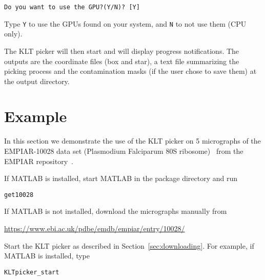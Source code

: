 \documentclass[12pt,a4paper]{article}
\begin{document}
\begin{flushleft}
	\texttt{Do you want to use the GPU?(Y/N)? [Y] }
\end{flushleft}
 Type \texttt{Y} to use the GPUs found on your system, and \texttt{N} to not use them (CPU only).

 \bigskip

 The KLT picker will then start and will display progress notifications.
 The outputs are the coordinate files (box and star), a text file summarizing the picking process  and the contamination masks (if the user chose to save them) at the output directory.

 \section{Example}\label{sec:example}
In this section we demonstrate the use of the KLT picker on 5 micrographs of the EMPIAR-10028 data set (Plasmodium Falciparum 80S ribosome)~\cite{10028} from the EMPIAR repository~\cite{EMPIAR}.

\bigskip

If MATLAB is installed, start MATLAB in the package directory and run
\begin{flushleft}
	\texttt{get10028 \thinspace \color{gray}{\# downloading 5 micrographs to  ./example/micrographs directory.}}
\end{flushleft}

If MATLAB is not installed, download the micrographs manually from
\begin{center}
\url{https://www.ebi.ac.uk/pdbe/emdb/empiar/entry/10028/}
\end{center}

Start the KLT picker as described in Section~\ref{sec:downloading}. For example, if MATLAB is installed, type
\begin{flushleft}
	\texttt{KLTpicker\_start}
\end{flushleft}

\bigskip
\end{document}
